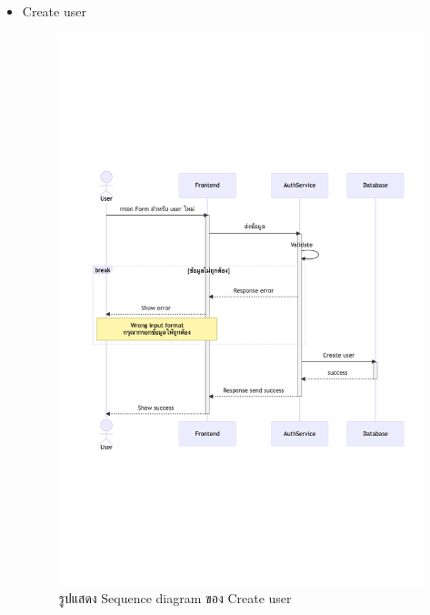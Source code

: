 \documentclass[12pt,oneside,openright,a4paper]{cpe-thai-project}
\begin{document}
\begin{itemize}
    \newpage
    \item Create user \\
    \begin{figure}[!ht]\centering
        \includegraphics[width=13cm, trim={0 9cm 0 9cm},clip]{./assets/sequence-diagram/create-user.png}
        \caption{รูปแสดง Sequence diagram ของ Create user}\label{fig:sqCreateUser}
    \end{figure}


\end{itemize}
\end{document}
